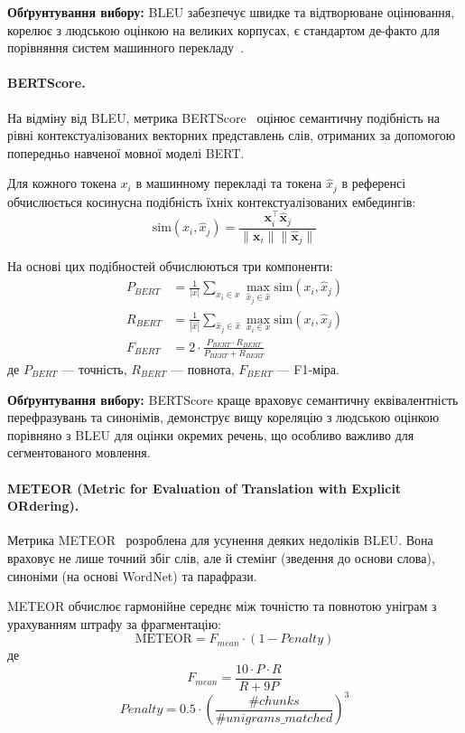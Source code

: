 \textbf{Обґрунтування вибору:} BLEU забезпечує швидке та відтворюване
оцінювання, корелює з людською оцінкою на великих корпусах, є стандартом
де-факто для порівняння систем машинного перекладу~\cite{post_bleu}.

\paragraph{BERTScore.}
На відміну від BLEU, метрика BERTScore~\cite{bert_score} оцінює семантичну
подібність на рівні контекстуалізованих векторних представлень слів,
отриманих за допомогою попередньо навченої мовної моделі BERT.

Для кожного токена $x_i$ в машинному перекладі та токена $\hat{x}_j$ в
референсі обчислюється косинусна подібність їхніх контекстуалізованих
ембедингів:
\begin{equation}
\text{sim}(x_i, \hat{x}_j) = \frac{\mathbf{x}_i^\top \hat{\mathbf{x}}_j}{\|\mathbf{x}_i\| \|\hat{\mathbf{x}}_j\|}
\end{equation}

На основі цих подібностей обчислюються три компоненти:
\begin{align}
P_{BERT} &= \frac{1}{|x|} \sum_{x_i \in x} \max_{\hat{x}_j \in \hat{x}} \text{sim}(x_i, \hat{x}_j) \\
R_{BERT} &= \frac{1}{|\hat{x}|} \sum_{\hat{x}_j \in \hat{x}} \max_{x_i \in x} \text{sim}(x_i, \hat{x}_j) \\
F_{BERT} &= 2 \cdot \frac{P_{BERT} \cdot R_{BERT}}{P_{BERT} + R_{BERT}}
\end{align}
де $P_{BERT}$ — точність, $R_{BERT}$ — повнота, $F_{BERT}$ — F1-міра.

\textbf{Обґрунтування вибору:} BERTScore краще враховує семантичну еквівалентність
перефразувань та синонімів, демонструє вищу кореляцію з людською оцінкою
порівняно з BLEU для оцінки окремих речень, що особливо важливо для
сегментованого мовлення.

\paragraph{METEOR (Metric for Evaluation of Translation with Explicit ORdering).}
Метрика METEOR~\cite{banerjee_meteor} розроблена для усунення деяких недоліків
BLEU. Вона враховує не лише точний збіг слів, але й стемінг (зведення до
основи слова), синоніми (на основі WordNet) та парафрази.

METEOR обчислює гармонійне середнє між точністю та повнотою уніграм з
урахуванням штрафу за фрагментацію:
\begin{equation}
\text{METEOR} = F_{mean} \cdot (1 - Penalty)
\end{equation}
де
\begin{equation}
F_{mean} = \frac{10 \cdot P \cdot R}{R + 9P}
\end{equation}
\begin{equation}
Penalty = 0.5 \cdot \left(\frac{\#chunks}{\#unigrams\_matched}\right)^3
\end{equation}

